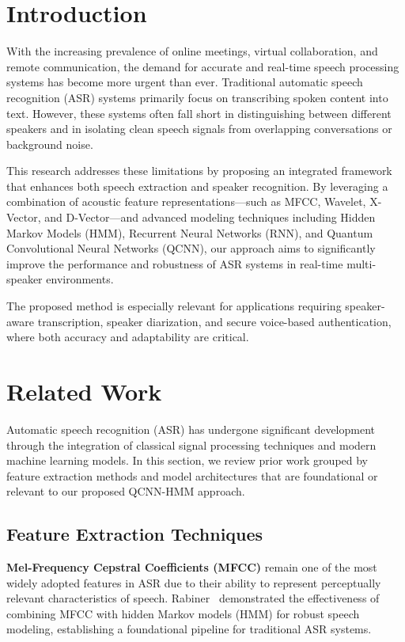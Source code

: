 \documentclass[conference]{IEEEtran}
\begin{document}
\section{Introduction}

With the increasing prevalence of online meetings, virtual collaboration, and remote communication, the demand for accurate and real-time speech processing systems has become more urgent than ever. Traditional automatic speech recognition (ASR) systems primarily focus on transcribing spoken content into text. However, these systems often fall short in distinguishing between different speakers and in isolating clean speech signals from overlapping conversations or background noise.

This research addresses these limitations by proposing an integrated framework that enhances both speech extraction and speaker recognition. By leveraging a combination of acoustic feature representations—such as MFCC, Wavelet, X-Vector, and D-Vector—and advanced modeling techniques including Hidden Markov Models (HMM), Recurrent Neural Networks (RNN), and Quantum Convolutional Neural Networks (QCNN), our approach aims to significantly improve the performance and robustness of ASR systems in real-time multi-speaker environments.

The proposed method is especially relevant for applications requiring speaker-aware transcription, speaker diarization, and secure voice-based authentication, where both accuracy and adaptability are critical.

\section{Related Work}

Automatic speech recognition (ASR) has undergone significant development through the integration of classical signal processing techniques and modern machine learning models. In this section, we review prior work grouped by feature extraction methods and model architectures that are foundational or relevant to our proposed QCNN-HMM approach.

\subsection{Feature Extraction Techniques}

\textbf{Mel-Frequency Cepstral Coefficients (MFCC)} remain one of the most widely adopted features in ASR due to their ability to represent perceptually relevant characteristics of speech. Rabiner~\cite{rabiner1989tutorial} demonstrated the effectiveness of combining MFCC with hidden Markov models (HMM) for robust speech modeling, establishing a foundational pipeline for traditional ASR systems.
\end{document}
